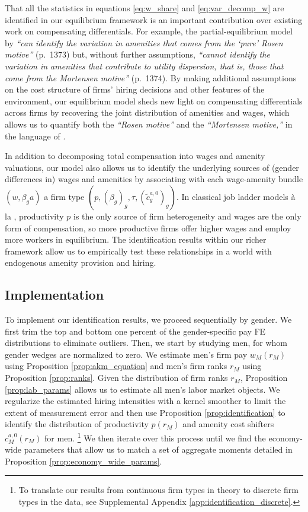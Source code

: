 That all the statistics in equations \eqref{eq:w_share} and \eqref{eq:var_decomp_w} are identified in our equilibrium framework is an important contribution over existing work on compensating differentials. For example, the partial-equilibrium model by \citet{Sorkin2018} \emph{``can identify the variation in amenities that comes from the `pure' Rosen motive''} (p.\ 1373) but, without further assumptions, \emph{``cannot identify the variation in amenities that contribute to utility dispersion, that is, those that come from the Mortensen motive''} (p.\ 1374). By making additional assumptions on the cost structure of firms' hiring decisions and other features of the environment, our equilibrium model sheds new light on compensating differentials across firms by recovering the joint distribution of amenities and wages, which allows us to quantify both the \emph{``Rosen motive''} and the \emph{``Mortensen motive,''} in the language of \citet{Sorkin2018}.

In addition to decomposing total compensation into wages and amenity valuations, our model also allows us to identify the underlying sources of (gender differences in) wages and amenities by associating with each wage-amenity bundle $(w, \beta_{g} a)$ a firm type $(p, (\beta_{g})_{g}, \tau, (\tilde{c}_{g}^{a,0})_{g})$. In classical job ladder models {\`{a}} la \citet{BurdettMortensen1998}, productivity $p$ is the only source of firm heterogeneity and wages are the only form of compensation, so more productive firms offer higher wages and employ more workers in equilibrium. The identification results within our richer framework allow us to empirically test these relationships in a world with endogenous amenity provision and hiring.


\subsection{Implementation\label{subsec:implementation}}

To implement our identification results, we proceed sequentially by gender. %
%
We first trim the top and bottom one percent of the gender-specific pay FE distributions to eliminate outliers. %
%
Then, we start by studying men, for whom gender wedges are normalized to zero. We estimate men's firm pay $w_{M}(r_{M})$ using Proposition \ref{prop:akm_equation} and men's firm ranks $r_{M}$ using Proposition \ref{prop:ranks}. Given the distribution of firm ranks $r_{M}$, Proposition \ref{prop:lab_params} allows us to estimate all men's labor market objects. We regularize the estimated hiring intensities with a kernel smoother to limit the extent of measurement error and then use Proposition \ref{prop:identification} to identify the distribution of productivity $p(r_{M})$ and amenity cost shifters $c_{M}^{a,0}(r_{M})$ for men.
%
\footnote{To translate our results from continuous firm types in theory to discrete firm types in the data, see Supplemental Appendix \ref{app:identification_discrete}.} %
%
We then iterate over this process until we find the economy-wide parameters that allow us to match a set of aggregate moments detailed in Proposition \ref{prop:economy_wide_params}.

